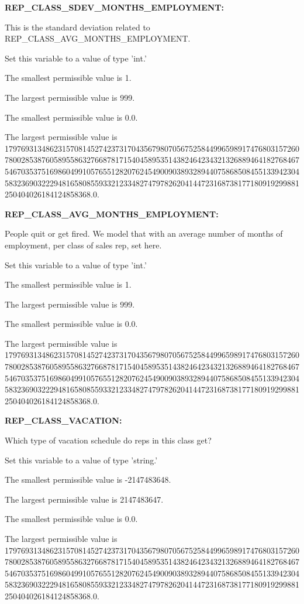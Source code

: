 \textbf{REP\_CLASS\_SDEV\_MONTHS\_EMPLOYMENT:}


This is the standard deviation related to REP\_CLASS\_AVG\_MONTHS\_EMPLOYMENT.

Set this variable to a value of type 'int.'

The smallest permissible value is 1.

The largest permissible value is 999.

The smallest permissible value is 0.0.

The largest permissible value is 179769313486231570814527423731704356798070567525844996598917476803157260780028538760589558632766878171540458953514382464234321326889464182768467546703537516986049910576551282076245490090389328944075868508455133942304583236903222948165808559332123348274797826204144723168738177180919299881250404026184124858368.0.


\textbf{REP\_CLASS\_AVG\_MONTHS\_EMPLOYMENT:}


People quit or get fired.  We model that with an average number of months of employment, per class of sales rep, set here.

Set this variable to a value of type 'int.'

The smallest permissible value is 1.

The largest permissible value is 999.

The smallest permissible value is 0.0.

The largest permissible value is 179769313486231570814527423731704356798070567525844996598917476803157260780028538760589558632766878171540458953514382464234321326889464182768467546703537516986049910576551282076245490090389328944075868508455133942304583236903222948165808559332123348274797826204144723168738177180919299881250404026184124858368.0.


\textbf{REP\_CLASS\_VACATION:}


Which type of vacation schedule do reps in this class get?

Set this variable to a value of type 'string.'

The smallest permissible value is -2147483648.

The largest permissible value is 2147483647.

The smallest permissible value is 0.0.

The largest permissible value is 179769313486231570814527423731704356798070567525844996598917476803157260780028538760589558632766878171540458953514382464234321326889464182768467546703537516986049910576551282076245490090389328944075868508455133942304583236903222948165808559332123348274797826204144723168738177180919299881250404026184124858368.0.

